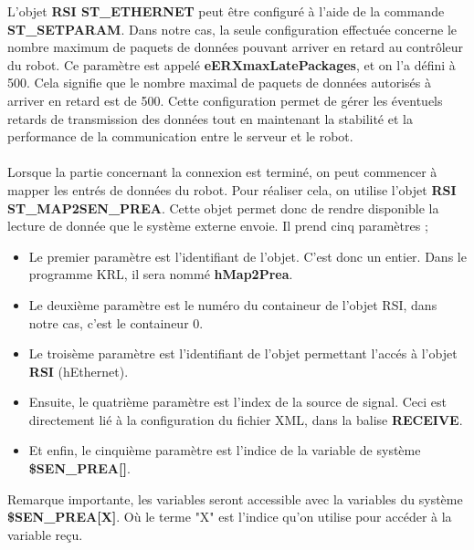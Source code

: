 L'objet \textbf{RSI ST\_ETHERNET} peut être configuré à l'aide de la commande \textbf{ST\_SETPARAM}.
Dans notre cas, la seule configuration effectuée concerne le nombre maximum de paquets de données pouvant arriver en retard au contrôleur du robot.
Ce paramètre est appelé \textbf{eERXmaxLatePackages}, et on l'a défini à 500. 
Cela signifie que le nombre maximal de paquets de données autorisés à arriver en retard est de 500.
Cette configuration permet de gérer les éventuels retards de transmission des données tout en maintenant la stabilité et la performance de la communication entre le serveur et le robot.
\\
\\
Lorsque la partie concernant la connexion est terminé, on peut commencer à mapper les entrés de données du robot.
Pour réaliser cela, on utilise l'objet \textbf{RSI ST\_MAP2SEN\_PREA}.
Cette objet permet donc de rendre disponible la lecture de donnée que le système externe envoie.
Il prend cinq paramètres ;
\begin{itemize}
    \item Le premier paramètre est l'identifiant de l'objet. C'est donc un entier. Dans le programme KRL, il sera nommé \textbf{hMap2Prea}.
    \item Le deuxième paramètre est le numéro du containeur de l'objet RSI, dans notre cas, c'est le containeur 0.
    \item Le troisème paramètre est l'identifiant de l'objet permettant l'accés à l'objet \textbf{RSI} (hEthernet).
    \item Ensuite, le quatrième paramètre est l'index de la source de signal. Ceci est directement lié à la configuration du fichier XML, dans la balise \textbf{RECEIVE}.
    \item Et enfin, le cinquième paramètre est l'indice de la variable de système \textbf{\$SEN\_PREA[]}.
\end{itemize}
Remarque importante, les variables seront accessible avec la variables du système \textbf{\$SEN\_PREA[X]}.
Où le terme "X" est l'indice qu'on utilise pour accéder à la variable reçu.
\\
\\

